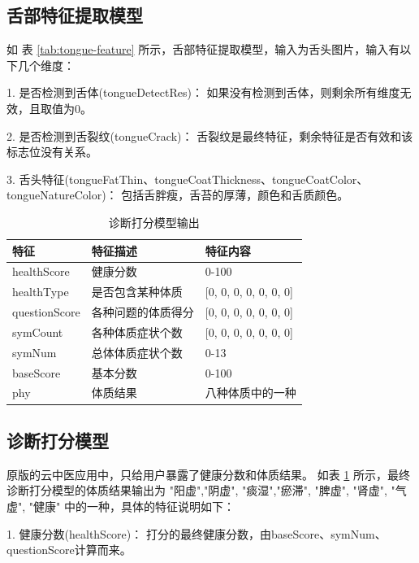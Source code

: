 \subsection{舌部特征提取模型}
如 表 \ref{tab:tongue-feature} 所示，舌部特征提取模型，输入为舌头图片，输入有以下几个维度：

1. 是否检测到舌体(tongueDetectRes)： 如果没有检测到舌体，则剩余所有维度无效，且取值为0。

2. 是否检测到舌裂纹(tongueCrack)： 舌裂纹是最终特征，剩余特征是否有效和该标志位没有关系。

3. 舌头特征(tongueFatThin、tongueCoatThickness、tongueCoatColor、tongueNatureColor)： 包括舌胖瘦，舌苔的厚薄，颜色和舌质颜色。

\begin{table}[]
    \begin{center}
        \begin{tabular}{lll}
            \toprule
            特征 & 特征描述 & 特征内容 \\ 
            \midrule
            healthScore & 健康分数 & 0-100 \\
            healthType & 是否包含某种体质 & {[}0, 0, 0, 0, 0, 0, 0{]} \\ 
            questionScore & 各种问题的体质得分 & {[}0, 0, 0, 0, 0, 0, 0{]} \\
            symCount & 各种体质症状个数 & {[}0, 0, 0, 0, 0, 0, 0{]} \\
            symNum & 总体体质症状个数 & 0-13 \\
            baseScore & 基本分数 & 0-100 \\
            phy & 体质结果 & 八种体质中的一种\\
            \bottomrule
        \end{tabular}
    \end{center}
    \caption{诊断打分模型输出}
    \label{tab:diag-feature}
\end{table}

\subsection{诊断打分模型}
原版的云中医应用中，只给用户暴露了健康分数和体质结果。
如表 \ref{tab:diag-feature} 所示，最终诊断打分模型的体质结果输出为 "阳虚","阴虚", "痰湿","瘀滞", "脾虚", "肾虚", "气虚", "健康" 中的一种，具体的特征说明如下：

1. 健康分数(healthScore)： 打分的最终健康分数，由baseScore、symNum、questionScore计算而来。

